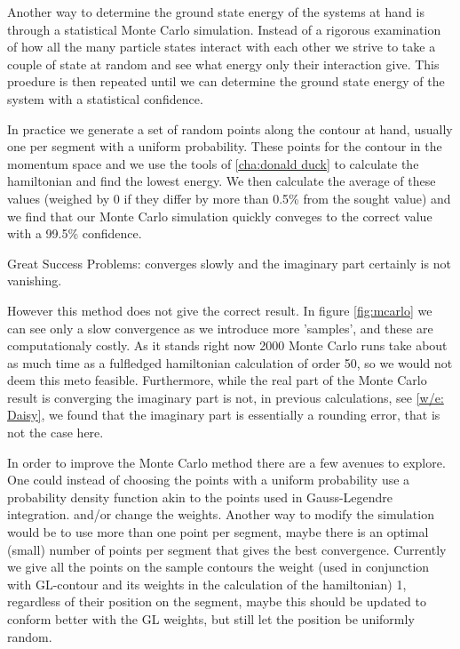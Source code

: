Another way to determine the ground state energy of the systems at hand is through a statistical Monte Carlo simulation. 
Instead of a rigorous examination of how all the many particle states interact with each other we strive to take a couple of state at random and see what energy only their interaction give. 
This proedure is then repeated until we can determine the ground state energy of the system with a statistical confidence.

In practice we generate a set of random points along the contour at hand, usually one per segment with a uniform probability. 
These points for the contour in the momentum space and we use the tools of \cref{cha:donald duck} to calculate the hamiltonian and find the lowest energy. 
We then calculate the average of these values (weighed by 0 if they differ by more than 0.5\% from the sought value) and we find that our Monte Carlo simulation quickly conveges to the correct value with a 99.5\% confidence.

Great Success
Problems: converges slowly and the imaginary part certainly is not vanishing.



However this method does not give the correct result. 
In figure \cref{fig:mcarlo} we can see only a slow convergence as we introduce more 'samples', and these are computationaly costly. 
As it stands right now 2000 Monte Carlo runs take about as much time as a fulfledged hamiltonian calculation of order 50, so we would not deem this meto feasible.
Furthermore, while the real part of the Monte Carlo result is converging the imaginary part is not, in previous calculations, see \cref{w/e: Daisy}, we found that the imaginary part is essentially a rounding error, that is not the case here.

In order to improve the Monte Carlo method there are a few avenues to explore.
One could instead of choosing the points with a uniform probability use a probability density function akin to the points used in Gauss-Legendre integration. 
and/or change the weights.
Another way to modify the simulation would be to use more than one point per segment, maybe there is an optimal (small) number of points per segment that gives the best convergence. 
Currently we give all the points on the sample contours the weight (used in conjunction with GL-contour and its weights in the calculation of the hamiltonian) 1, regardless of their position on the segment, maybe this should be updated to conform better with the GL weights, but still let the position be uniformly random.